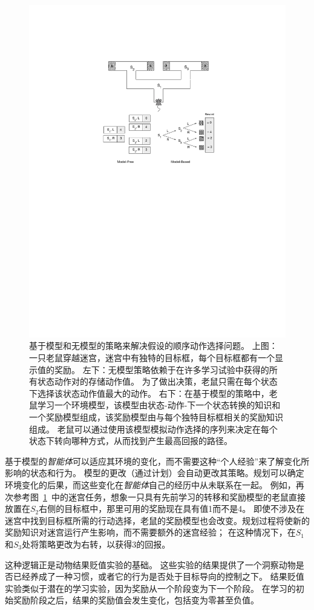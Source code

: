 \begin{figure}[!htb]
	\centering
	\includegraphics[width=0.65\linewidth]{chap11/fig_11_8}
	\caption{基于模型和无模型的策略来解决假设的顺序动作选择问题。
		上图：一只老鼠穿越迷宫，迷宫中有独特的目标框，每个目标框都有一个显示值的奖励。
		左下：无模型策略依赖于在许多学习试验中获得的所有状态动作对的存储动作值。
		为了做出决策，老鼠只需在每个状态下选择该状态动作值最大的动作。
		右下：在基于模型的策略中，老鼠学习一个环境模型，该模型由状态-动作-下一个状态转换的知识和一个奖励模型组成，该奖励模型由与每个独特目标框相关的奖励知识组成。
		老鼠可以通过使用该模型模拟动作选择的序列来决定在每个状态下转向哪种方式，从而找到产生最高回报的路径。
		\label{fig:11_8}}
\end{figure}


基于模型的\textit{智能体}可以适应其环境的变化，而不需要这种“个人经验”来了解变化所影响的状态和行为。
模型的更改（通过计划）会自动更改其策略。规划可以确定环境变化的后果，而这些变化在\textit{智能体}自己的经历中从未联系在一起。
例如，再次参考图~\ref{fig:11_8}~中的迷宫任务，想象一只具有先前学习的转移和奖励模型的老鼠直接放置在$ S_2 $右侧的目标框中，那里可用的奖励现在具有值1而不是4。
即使不涉及在迷宫中找到目标框所需的行动选择，老鼠的奖励模型也会改变。规划过程将使新的奖励知识对迷宫运行产生影响，而不需要额外的迷宫经验；
在这种情况下，在$ S_1 $和$ S_3 $处将策略更改为右转，以获得3的回报。


这种逻辑正是动物结果贬值实验的基础。
这些实验的结果提供了一个洞察动物是否已经养成了一种习惯，或者它的行为是否处于目标导向的控制之下。
结果贬值实验类似于潜在的学习实验，因为奖励从一个阶段变为下一个阶段。
在学习的初始奖励阶段之后，结果的奖励值会发生变化，包括变为零甚至负值。


